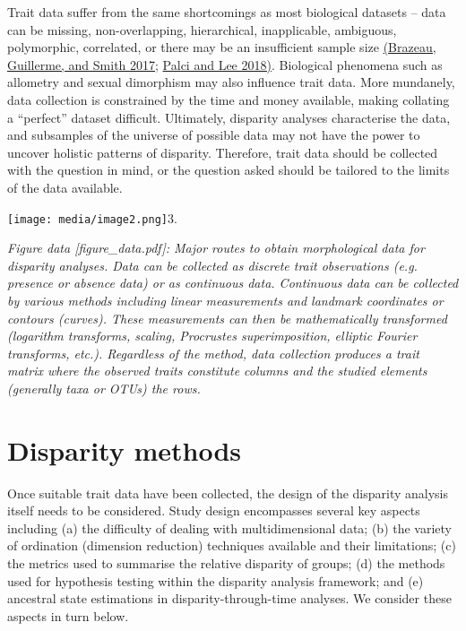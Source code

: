 Trait data suffer from the same shortcomings as most biological datasets -- data can be missing, non-overlapping, hierarchical, inapplicable, ambiguous, polymorphic, correlated, or there may be an insufficient sample size \href{https://paperpile.com/c/sTGYvp/Yrbg}{(Brazeau, Guillerme, and Smith 2017}; \href{https://paperpile.com/c/sTGYvp/yO2t}{Palci and Lee 2018)}.
Biological phenomena such as allometry and sexual dimorphism may also influence trait data.
More mundanely, data collection is constrained by the time and money available, making collating a ``perfect'' dataset difficult.
Ultimately, disparity analyses characterise the data, and subsamples of the universe of possible data may not have the power to uncover holistic patterns of disparity.
Therefore, trait data should be collected with the question in mind, or the question asked should be tailored to the limits of the data available.

\texttt{[image: media/image2.png]}3.

\emph{Figure data {[}figure\_data.pdf{]}: Major routes to obtain morphological data for disparity analyses. Data can be collected as discrete trait observations (e.g. presence or absence data) or as continuous data.
Continuous data can be collected by various methods including linear measurements and landmark coordinates or contours (curves).
These measurements can then be mathematically transformed (logarithm transforms, scaling, Procrustes superimposition, elliptic Fourier transforms, etc.).
Regardless of the method, data collection produces a trait matrix where the observed traits constitute columns and the studied elements (generally taxa or OTUs) the rows.}

\hypertarget{disparity-methods}{%
\section{Disparity methods}\label{disparity-methods}}

Once suitable trait data have been collected, the design of the disparity analysis itself needs to be considered.
Study design encompasses several key aspects including (a) the difficulty of dealing with multidimensional data; (b) the variety of ordination (dimension reduction) techniques available and their limitations; (c) the metrics used to summarise the relative disparity of groups; (d) the methods used for hypothesis testing within the disparity analysis framework; and (e) ancestral state estimations in disparity-through-time analyses.
We consider these aspects in turn below.
















